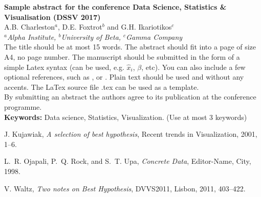 
\setlength{\textwidth}{160mm}\setlength{\textheight}{240mm}
\setlength{\oddsidemargin}{0mm}\setlength{\evensidemargin}{0mm}
\setlength{\topmargin}{-10mm}
\setlength{\parindent}{0mm} 
\pagestyle{empty}	%



{\Large\bf Sample abstract for the conference Data Science, Statistics \& Visualisation (DSSV 2017) }\\[4mm]

A.B. Charleston$^a$, D.E. Foxtrot$^b$ and G.H. Ikariotikos$^c$\\ 				

{\small \em $^a$Alpha Institute, $^b$University of Beta, $^c$Gamma 
Company}\\[3mm]


The title should be at most 15 words.
The abstract should fit into a page of size A4, no page number. The manuscript should be submitted in the 
form of a simple Latex syntax (can be used, e.g. $\hat{x}_i$, $\beta$, etc). You can also 
include a few optional references, such as \cite{journal01}, \cite{book98} or \cite{procc11}. Plain text should be used and without any accents. The LaTex source file .tex can be used as a 
template.\\

By submitting an abstract the authors agree to its publication at 
the conference programme.\\

\textbf{Keywords:} Data science, Statistics, Visualization. (Use at most 3 keywords)

\begin{thebibliography}{00}
 J. Kujawiak, \emph{A selection of best hypothesis}, Recent trends in Visualization, 2001, 1--6.

L.~R. Ojapali, P.~Q. Rock, and S.~T. Upa, \emph{Concrete Data}, Editor-Name, City, 1998.

 V. Waltz, \emph{Two notes on Best Hypothesis}, DVVS2011, Lisbon, 2011, 403--422.
\end{thebibliography}



